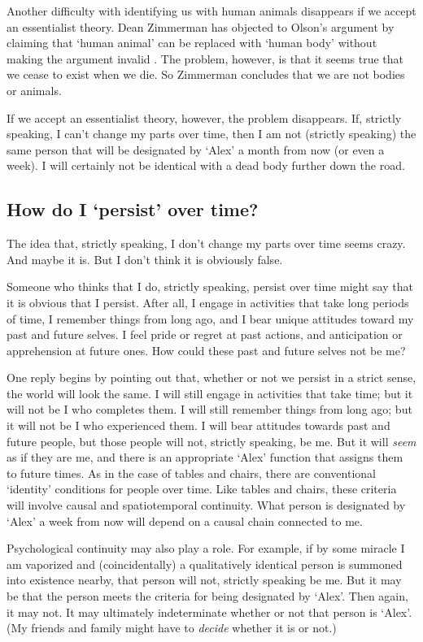 \documentclass[11pt]{article}
\begin{document}
\begin{spacing}{1.5}
Another difficulty with identifying us with human animals disappears
if we accept an essentialist theory.  Dean Zimmerman has objected to
Olson's argument by claiming that `human animal' can be replaced with
`human body' without making the argument invalid
\citeyearpar[24]{zimmerman2008a}.  The problem, however, is that it
seems true that we cease to exist when we die.  So Zimmerman concludes
that we are not bodies or animals.

If we accept an essentialist theory, however, the problem disappears.
If, strictly speaking, I can't change my parts over time, then I am
not (strictly speaking) the same person that will be designated by
`Alex' a month from now (or even a week).  I will certainly not be
identical with a dead body further down the road.

\subsection{How do I `persist' over time?}
\label{person-persist}
The idea that, strictly speaking, I don't change my parts over time
seems crazy.  And maybe it is.  But I don't think it is obviously
false.

Someone who thinks that I do, strictly speaking, persist over time
might say that it is obvious that I persist.  After all, I engage in
activities that take long periods of time, I remember things from long
ago, and I bear unique attitudes toward my past and future selves.  I
feel pride or regret at past actions, and anticipation or apprehension
at future ones.  How could these past and future selves not be me?

One reply begins by pointing out that, whether or not we persist in a
strict sense, the world will look the same.  I will still engage in
activities that take time; but it will not be I who completes them.  I
will still remember things from long ago; but it will not be I who
experienced them.  I will bear attitudes towards past and future
people, but those people will not, strictly speaking, be me.  But it
will {\em seem} as if they are me, and there is an appropriate `Alex'
function that assigns them to future times.  As in the case of tables
and chairs, there are conventional `identity' conditions for people
over time.  Like tables and chairs, these criteria will involve causal
and spatiotemporal continuity.  What person is designated by `Alex'
a week from now will depend on a causal chain connected to me.

Psychological continuity may also play a role.  For example, if by
some miracle I am vaporized and (coincidentally) a qualitatively
identical person is summoned into existence nearby, that person will
not, strictly speaking be me.  But it may be that the person meets the
criteria for being designated by `Alex'.  Then again, it may not.
It may ultimately indeterminate whether or not that person is `Alex'.
(My friends and family might have to {\em decide} whether it is or
not.)


\end{spacing}
\end{document}
